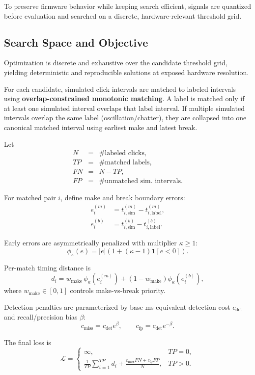 To preserve firmware behavior while keeping search efficient, signals are quantized before evaluation and searched on a discrete, hardware-relevant threshold grid.

\subsection{Search Space and Objective}
Optimization is discrete and exhaustive over the candidate threshold grid, yielding deterministic and reproducible solutions at exposed hardware resolution.

For each candidate, simulated click intervals are matched to labeled intervals using \textbf{overlap-constrained monotonic matching}. A label is matched only if at least one simulated interval overlaps that label interval. If multiple simulated intervals overlap the same label (oscillation/chatter), they are collapsed into one canonical matched interval using earliest make and latest break.

Let
\[
\begin{array}{rcl}
N  & = & \text{\# labeled clicks},\\
TP & = & \text{\# matched labels},\\
FN & = & N-TP,\\
FP & = & \text{\# unmatched sim.\ intervals}.
\end{array}
\]

For matched pair $i$, define make and break boundary errors:
\[
\begin{aligned}
e_i^{(m)} &= t_{i,\mathrm{sim}}^{(m)} - t_{i,\mathrm{label}}^{(m)},\\
e_i^{(b)} &= t_{i,\mathrm{sim}}^{(b)} - t_{i,\mathrm{label}}^{(b)}.
\end{aligned}
\]

Early errors are asymmetrically penalized with multiplier $\kappa \ge 1$:
\[
\phi_\kappa(e)=|e|\left(1+(\kappa-1)\mathbf{1}[e<0]\right).
\]

Per-match timing distance is
\[
d_i = w_{\mathrm{make}}\,\phi_\kappa\!\left(e_i^{(m)}\right)
+ \left(1-w_{\mathrm{make}}\right)\phi_\kappa\!\left(e_i^{(b)}\right),
\]
where $w_{\mathrm{make}} \in [0,1]$ controls make-vs-break priority.

Detection penalties are parameterized by base ms-equivalent detection cost $c_{\mathrm{det}}$ and recall/precision bias $\beta$:
\[
c_{\mathrm{miss}} = c_{\mathrm{det}}e^{\beta},\qquad
c_{\mathrm{fp}} = c_{\mathrm{det}}e^{-\beta}.
\]

The final loss is
\[
\mathcal{L}=
\begin{cases}
\infty, & TP=0,\\[4pt]
\displaystyle \frac{1}{TP}\sum_{i=1}^{TP} d_i
+ \frac{c_{\mathrm{miss}}FN + c_{\mathrm{fp}}FP}{N}, & TP>0.
\end{cases}
\]

